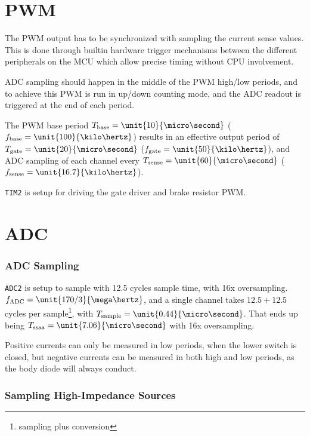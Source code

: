\documentclass[12pt,a4paper,oneside,openany]{article}
\begin{document}
\section{PWM}

The PWM output has to be synchronized with sampling the current sense values. This is done through builtin hardware trigger mechanisms between the different peripherals on the MCU which allow precise timing without CPU involvement.

ADC sampling should happen in the middle of the PWM high/low periods, and to achieve this PWM is run in up/down counting mode, and the ADC readout is triggered at the end of each period.

The PWM base period $T_{\textrm{base}} = \unit{10}{\micro\second}$ ($f_{\textrm{base}} = \unit{100}{\kilo\hertz}$) results in an effective output period of $T_{\textrm{gate}} = \unit{20}{\micro\second}$ ($f_{\textrm{gate}} = \unit{50}{\kilo\hertz}$), and ADC sampling of each channel every $T_{\textrm{sense}} = \unit{60}{\micro\second}$ ($f_{\textrm{sense}} = \unit{16.7}{\kilo\hertz}$).

\texttt{TIM2} is setup for driving the gate driver and brake resistor PWM.

\section {ADC}

\subsubsection{ADC Sampling}

\texttt{ADC2} is setup to sample with 12.5 cycles sample time, with 16x oversampling. $f_{\textrm{ADC}} = \unit{170/3}{\mega\hertz}$, and a single channel takes $12.5+12.5$ cycles per sample\footnote{sampling plus conversion}, with $T_{\textrm{sample}} = \unit{0.44}{\micro\second}$. That ends up being $T_{\textrm{ssaa}} = \unit{7.06}{\micro\second}$ with 16x oversampling.

Positive currents can only be measured in low periods, when the lower switch is closed, but negative currents can be measured in both high and low periods, as the body diode will always conduct.

\subsubsection{Sampling High-Impedance Sources}
\end{document}
